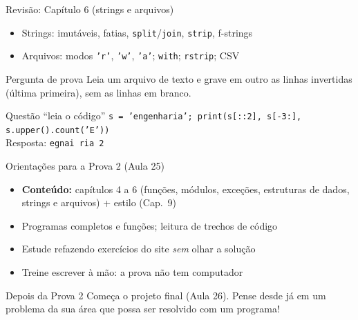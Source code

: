 \documentclass[aspectratio=169,10pt,t]{beamer}
\begin{document}
\begin{frame}{Revisão: Capítulo 6 (strings e arquivos)}
  \begin{itemize}
    \item Strings: imutáveis, fatias, \texttt{split}/\texttt{join}, \texttt{strip}, f-strings
    \item Arquivos: modos \texttt{'r'}, \texttt{'w'}, \texttt{'a'}; \texttt{with}; \texttt{rstrip}; CSV
  \end{itemize}
  \begin{exampleblock}{Pergunta de prova}
    Leia um arquivo de texto e grave em outro as linhas \alert{invertidas} (última primeira), sem as linhas em branco.
  \end{exampleblock}
  \begin{block}{Questão ``leia o código''}
    \texttt{s = 'engenharia'; print(s[::2], s[-3:], s.upper().count('E'))}\\
    \small Resposta: \texttt{egnai ria 2}
  \end{block}
\end{frame}

\begin{frame}{Orientações para a Prova 2 (Aula 25)}
  \begin{itemize}
    \item \textbf{Conteúdo:} capítulos 4 a 6 (funções, módulos, exceções, estruturas de dados, strings e arquivos) + estilo (Cap.~9)
    \item Programas completos e funções; leitura de trechos de código
    \item Estude refazendo exercícios do site \emph{sem} olhar a solução
    \item Treine escrever à mão: a prova não tem computador
  \end{itemize}
  \begin{alertblock}{Depois da Prova 2}
    Começa o projeto final (Aula 26). Pense desde já em um problema da sua área que possa ser resolvido com um programa!
  \end{alertblock}
\end{frame}

\end{document}
